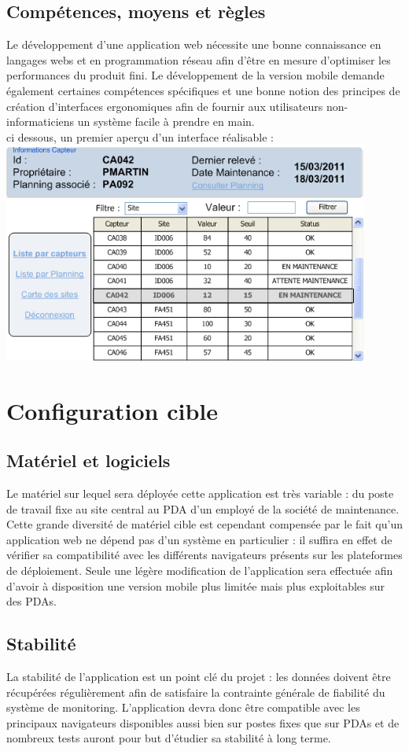 \subsection{Compétences, moyens et règles}
Le développement d'une application web nécessite une bonne connaissance en langages webs et en programmation réseau afin d'être en mesure d'optimiser les performances du produit fini. Le développement de la version mobile demande également certaines compétences spécifiques et une bonne notion des principes de création d'interfaces ergonomiques afin de fournir aux utilisateurs non-informaticiens un système facile à prendre en main.\\
ci dessous, un premier aperçu d'un interface réalisable : \\
\includegraphics[width=0.9\textwidth]{AppliWebMonitor.png} 

\section{Configuration cible}
\subsection{Matériel et logiciels}
Le matériel sur lequel sera déployée cette application est très variable : du poste de travail fixe au site central au PDA d'un employé de la société de maintenance. Cette grande diversité de matériel cible est cependant compensée par le fait qu'un application web ne dépend pas d'un système en particulier : il suffira en effet de vérifier sa compatibilité avec les différents navigateurs présents sur les plateformes de déploiement. Seule une légère modification de l'application sera effectuée afin d'avoir à disposition une version mobile plus limitée mais plus exploitables sur des PDAs.

\subsection{Stabilité}
La stabilité de l'application est un point clé du projet : les données doivent être récupérées régulièrement afin de satisfaire la contrainte générale de fiabilité du système de monitoring. L'application devra donc être compatible avec les principaux navigateurs disponibles aussi bien sur postes fixes que sur PDAs et de nombreux tests auront pour but d'étudier sa stabilité à long terme.

